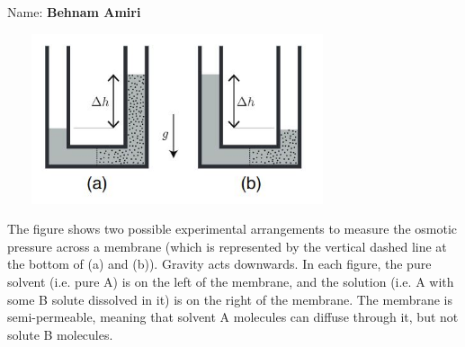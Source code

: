\documentclass[fleqn]{article}
\begin{document}
  Name: \textbf{Behnam Amiri}

  \vspace{1cm}

  \begin{center}
    \includegraphics[height=5cm, width=10cm]{1.JPG}
  \end{center}

  The figure shows two possible experimental arrangements to measure the osmotic pressure across
  a membrane (which is represented by the vertical dashed line at the bottom of (a) and (b)). Gravity
  acts downwards. In each figure, the pure solvent (i.e. pure A) is on the left of the membrane, and
  the solution (i.e. A with some B solute dissolved in it) is on the right of the membrane. The
  membrane is semi-permeable, meaning that solvent A molecules can diffuse through it, but not
  solute B molecules.
\end{document}

